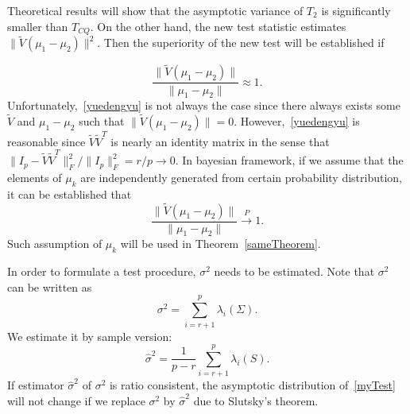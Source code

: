 \documentclass[review]{elsarticle}
\theoremstyle{plain}
\theoremstyle{definition}
\theoremstyle{remark}
\begin{document}
    Theoretical results will show that the asymptotic variance of $T_2$ is significantly smaller than $T_{CQ}$. 
    On the other hand, the new test statistic estimates $\|\tilde{V}(\mu_1-\mu_2)\|^2$.
    Then the superiority of the new test will be established if 
    
\begin{equation}\label{yuedengyu}
    \frac{\|\tilde{V}(\mu_1-\mu_2)\|}{\|\mu_1-\mu_2\|}\approx 1.
\end{equation}
Unfortunately,~\eqref{yuedengyu}
is not always the case since there always exists some
$\tilde{V}$ and $\mu_1-\mu_2$ such that $\|\tilde{V}(\mu_1-\mu_2)\|=0$.
However,~\eqref{yuedengyu} is reasonable since $\tilde{V}\tilde{V}^T$ is nearly an identity matrix in the sense that
    ${\|I_p-\tilde{V}\tilde{V}^T\|_F^2}/{\|I_p\|_F^2}=r/p\to 0$. 
In bayesian framework, if we assume that the elements of $\mu_k$ are independently generated from certain probability distribution, it can be established that 
\begin{equation*}
    \frac{\|\tilde{V}(\mu_1-\mu_2)\|}{\|\mu_1-\mu_2\|}\xrightarrow{P}1.
\end{equation*}
Such assumption of $\mu_k$ will be used in Theorem~\ref{sameTheorem}.


In order to formulate a test procedure, $\sigma^2$ needs to be estimated.  Note that $\sigma^2$ can be written as
\begin{equation}\label{jjjVariance}
    \sigma^2=\sum_{i=r+1}^{p}\lambda_i(\Sigma).
\end{equation}
We estimate it by sample version:
\begin{equation*}
    \hat{\sigma}^2=\frac{1}{p-r}\sum_{i=r+1}^{p} \lambda_i(S).
\end{equation*}
If estimator $\hat{\sigma}^2$ of $\sigma^2$ is ratio consistent, the asymptotic distribution of~\eqref{myTest} will not change if we replace $\sigma^2$ by $\hat{\sigma}^2$  due to Slutsky's theorem.

\end{document}
